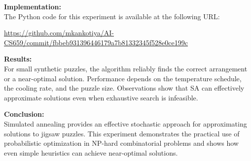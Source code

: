 \documentclass[a4paper,12pt]{article}  %
\begin{document}
\vspace{3mm}
\noindent \textbf{Implementation:} \\
The Python code for this experiment is available at the following URL: \\
\begin{center}
\url{https://github.com/mkankotiya/AI-CS659/commit/fbbeb931396446179a7b81332345f528e0ce199c}
\end{center}

\vspace{3mm}
\noindent \textbf{Results:} \\
For small synthetic puzzles, the algorithm reliably finds the correct arrangement or a near-optimal solution. Performance depends on the temperature schedule, the cooling rate, and the puzzle size. Observations show that SA can effectively approximate solutions even when exhaustive search is infeasible.

\vspace{3mm}
\noindent \textbf{Conclusion:} \\
Simulated annealing provides an effective stochastic approach for approximating solutions to jigsaw puzzles. This experiment demonstrates the practical use of probabilistic optimization in NP-hard combinatorial problems and shows how even simple heuristics can achieve near-optimal solutions.
\end{document}
